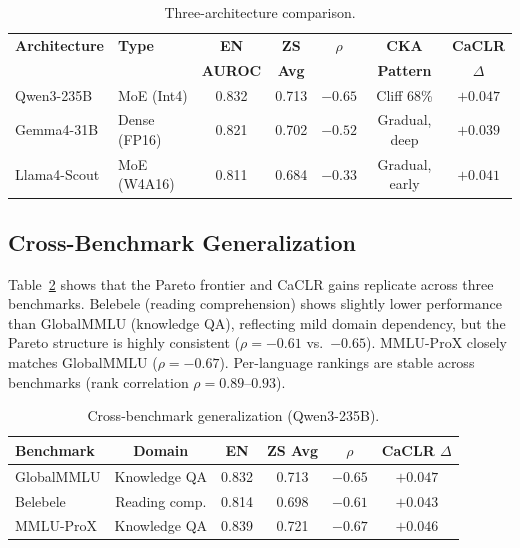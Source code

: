 \documentclass[11pt,a4paper]{article}
\begin{document}
\begin{table}[t]
\centering
\caption{Three-architecture comparison.}
\label{tab:three_arch}
\small
\begin{tabular}{llccccc}
\toprule
\textbf{Architecture} & \textbf{Type} & \textbf{EN} & \textbf{ZS} & \textbf{$\rho$} & \textbf{CKA} & \textbf{CaCLR} \\
 & & \textbf{AUROC} & \textbf{Avg} & & \textbf{Pattern} & \textbf{$\Delta$} \\
\midrule
Qwen3-235B  & MoE (Int4)  & 0.832 & 0.713 & $-0.65$ & Cliff 68\% & $+0.047$ \\
Gemma4-31B  & Dense (FP16)& 0.821 & 0.702 & $-0.52$ & Gradual, deep & $+0.039$ \\
Llama4-Scout& MoE (W4A16) & 0.811 & 0.684 & $-0.33$ & Gradual, early & $+0.041$ \\
\bottomrule
\end{tabular}
\end{table}


\subsection{Cross-Benchmark Generalization}
\label{sec:benchmarks}

Table~\ref{tab:benchmarks} shows that the Pareto frontier and CaCLR gains replicate across three benchmarks.
Belebele (reading comprehension) shows slightly lower performance than GlobalMMLU (knowledge QA), reflecting mild domain dependency, but the Pareto structure is highly consistent ($\rho = -0.61$ vs.\ $-0.65$).
MMLU-ProX closely matches GlobalMMLU ($\rho = -0.67$).
Per-language rankings are stable across benchmarks (rank correlation $\rho = 0.89$--$0.93$).

\begin{table}[t]
\centering
\caption{Cross-benchmark generalization (Qwen3-235B).}
\label{tab:benchmarks}
\small
\begin{tabular}{lccccc}
\toprule
\textbf{Benchmark} & \textbf{Domain} & \textbf{EN} & \textbf{ZS Avg} & \textbf{$\rho$} & \textbf{CaCLR $\Delta$} \\
\midrule
GlobalMMLU & Knowledge QA & 0.832 & 0.713 & $-0.65$ & $+0.047$ \\
Belebele   & Reading comp.& 0.814 & 0.698 & $-0.61$ & $+0.043$ \\
MMLU-ProX  & Knowledge QA & 0.839 & 0.721 & $-0.67$ & $+0.046$ \\
\bottomrule
\end{tabular}
\end{table}
\end{document}
